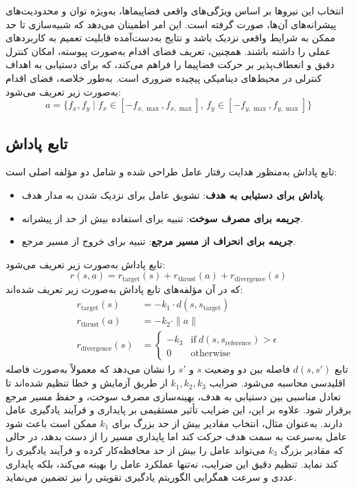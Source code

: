 	انتخاب این نیروها بر اساس ویژگی‌های واقعی فضاپیماها، به‌ویژه توان و محدودیت‌های پیشرانه‌های آن‌ها، صورت گرفته است. این امر اطمینان می‌دهد که شبیه‌سازی تا حد ممکن به شرایط واقعی نزدیک باشد و نتایج به‌دست‌آمده قابلیت تعمیم به کاربردهای عملی را داشته باشند. همچنین، تعریف فضای اقدام به‌صورت پیوسته، امکان کنترل دقیق و انعطاف‌پذیر بر حرکت فضاپیما را فراهم می‌کند، که برای دستیابی به اهداف کنترلی در محیط‌های دینامیکی پیچیده ضروری است.
	به‌طور خلاصه، فضای اقدام به‌صورت زیر تعریف می‌شود:
	\[
	a = \{ f_x, f_y \mid f_x \in [-f_{x,\max}, f_{x,\max}], \, f_y \in [-f_{y,\max}, f_{y,\max}] \}
	\]
	
	
	
	
	
	
	
	
	
	
	
	
	
	
	
	\subsection{تابع پاداش }
	تابع پاداش
 به‌منظور هدایت رفتار عامل طراحی شده و شامل دو مؤلفه اصلی است:
	\begin{itemize}
		\item \textbf{پاداش برای دستیابی به هدف}: تشویق عامل برای نزدیک شدن به مدار هدف.
		\item \textbf{جریمه برای مصرف سوخت}: تنبیه برای استفاده بیش از حد از پیشرانه.
		\item \textbf{جریمه برای انحراف از مسیر مرجع}: تنبیه برای خروج از مسیر مرجع.
	\end{itemize}
	تابع پاداش به‌صورت زیر تعریف می‌شود:
	\[
	r(s, a) = r_{\text{target}}(s) + r_{\text{thrust}}(a)  + r_{\text{divergence}}(s)
	\]
	که در آن مؤلفه‌های تابع پاداش به‌صورت زیر تعریف شده‌اند:
	\begin{align}
	r_{\text{target}}(s) &= -k_1 \cdot d(s, s_{\text{target}}) \\
	r_{\text{thrust}}(a) &= -k_2 \cdot \|a\| \\	
	r_{\text{divergence}}(s) &= \begin{cases}
	-k_3 & \text{if} ~ d(s, s_{\text{reference}}) > \epsilon \\
	0 & \text{otherwise}
	\end{cases}
	\end{align}
تابع \( d(s, s') \) فاصله بین دو وضعیت \( s \) و \( s' \) را نشان می‌دهد که معمولاً به‌صورت فاصله اقلیدسی محاسبه می‌شود.
ضرایب \( k_1, k_2, k_3 \) از طریق آزمایش و خطا تنظیم شده‌اند تا تعادل مناسبی بین دستیابی به هدف، بهینه‌سازی مصرف سوخت، و حفظ مسیر مرجع برقرار شود. علاوه بر این، این ضرایب تأثیر مستقیمی بر پایداری و فرآیند یادگیری عامل دارند. به‌عنوان مثال، انتخاب مقادیر بیش از حد بزرگ برای \( k_1 \) ممکن است باعث شود عامل به‌سرعت به سمت هدف حرکت کند اما پایداری مسیر را از دست بدهد، در حالی که مقادیر بزرگ \( k_3 \) می‌تواند عامل را بیش از حد محافظه‌کار کرده و فرآیند یادگیری را کند نماید. تنظیم دقیق این ضرایب، نه‌تنها عملکرد عامل را بهینه می‌کند، بلکه پایداری عددی و سرعت همگرایی الگوریتم یادگیری تقویتی را نیز تضمین می‌نماید.
	
